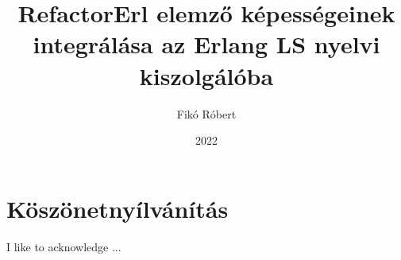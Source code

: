 \documentclass[
]{elteikthesis}[2021/09/20]
\title{RefactorErl elemző képességeinek integrálása az Erlang LS nyelvi
kiszolgálóba} %
\date{2022} %
\author{Fikó Róbert}
\affiliation{Egyetemi docens, Egyetemi adjunktus} %
\begin{document}

\listoftodos[\todolabel]


\maketitle



\tableofcontents
\cleardoublepage

\chapter*{Köszönetnyílvánítás}
\thispagestyle{empty}

I like to acknowledge ...

\clearpage


\cleardoublepage


\cleardoublepage


\cleardoublepage


\cleardoublepage



{}
\printbibliography[title=\biblabel]
\cleardoublepage

{}
\listoffigures
\cleardoublepage



{}
\lstlistoflistings
\cleardoublepage

\end{document}
